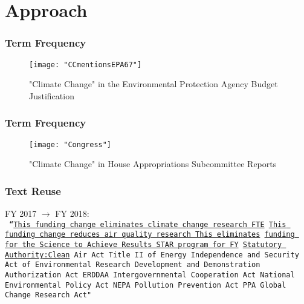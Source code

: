 \documentclass[10pt]{beamer}
\begin{document}
  \section{Approach}
  

\begin{frame}
\frametitle{Term Frequency}
\begin{figure}[h!]
\label{ccEPA67}
\centering
\caption{"Climate Change" in the Environmental Protection Agency Budget Justification}
\texttt{[image: "CCmentionsEPA67"]}
\end{figure}
\end{frame}

  
  
\begin{frame}
\frametitle{Term Frequency}
\begin{figure}[h!]
\label{ccEPA67}
\centering
\caption{"Climate Change" in House Appropriations Subcommittee Reports}
\texttt{[image: "Congress"]}
\end{figure}
\end{frame}



\begin{frame}
\frametitle{Text Reuse}

FY 2017 $\rightarrow$ FY 2018:\\

\texttt{
``\underline{This funding change eliminates climate change research FTE} \underline{This funding change reduces air quality research This eliminates} \underline{funding for the Science to Achieve Results STAR program for FY} \underline{Statutory Authority:Clean} Air Act Title II of Energy Independence and Security Act of Environmental Research Development and Demonstration Authorization Act ERDDAA Intergovernmental Cooperation Act National Environmental Policy Act NEPA Pollution Prevention Act PPA Global Change Research Act"}

\end{frame}
\end{document}
